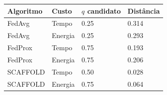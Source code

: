 \begin{tabular}{llll}
\toprule
Algoritmo & Custo & $q$ candidato & Distância \\
\midrule
FedAvg & Tempo & 0.25 & 0.314 \\
FedAvg & Energia & 0.25 & 0.293 \\
FedProx & Tempo & 0.75 & 0.193 \\
FedProx & Energia & 0.75 & 0.206 \\
SCAFFOLD & Tempo & 0.50 & 0.028 \\
SCAFFOLD & Energia & 0.75 & 0.064 \\
\bottomrule
\end{tabular}
